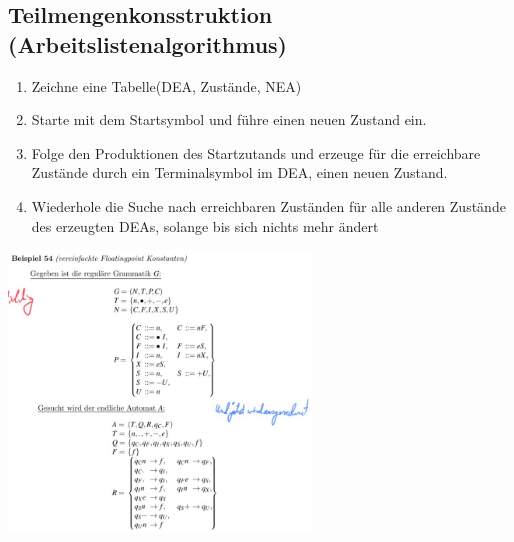 \subsection{Teilmengenkonsstruktion (Arbeitslistenalgorithmus)}
\begin{enumerate}
    \item Zeichne eine Tabelle(DEA, Zustände, NEA)
    \item Starte mit dem Startsymbol und führe einen neuen Zustand ein.
    \item Folge den Produktionen des Startzutands und erzeuge für die erreichbare Zustände durch ein Terminalsymbol im DEA, einen neuen Zustand.
    \item Wiederhole die Suche nach erreichbaren Zuständen für alle anderen Zustände des erzeugten DEAs, solange bis sich nichts mehr ändert
\end{enumerate}
\begin{center}
    \includegraphics[height=7.5cm]{image/Tabelle_Teilmengen.jpg}
  \end{center}